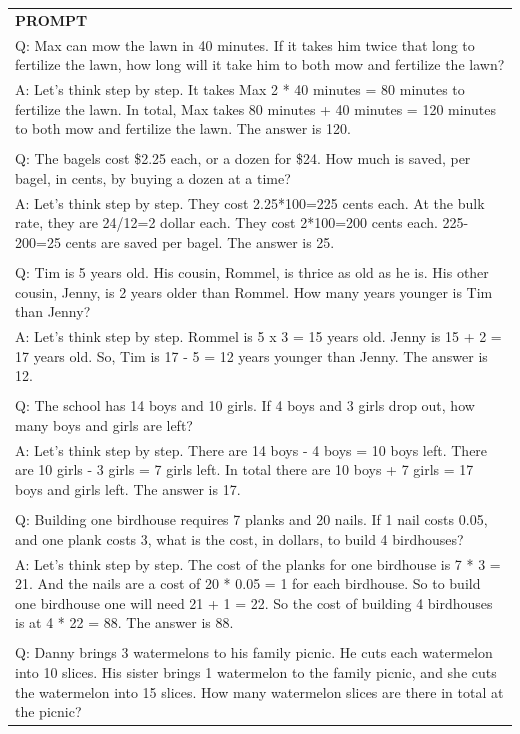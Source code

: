 \begin{table}[h]
    \centering \small
\begin{tabular}{p{13cm}}
\toprule
\textbf{PROMPT}\\
Q: Max can mow the lawn in 40 minutes. If it takes him twice that long to fertilize the lawn, how long will it take him to both mow and fertilize the lawn?
\\A: Let's think step by step. It takes Max 2 * 40 minutes = 80 minutes to fertilize the lawn. In total, Max takes 80 minutes + 40 minutes = 120 minutes to both mow and fertilize the lawn. The answer is 120.
\\
\\Q: The bagels cost \$2.25 each, or a dozen for \$24. How much is saved, per bagel, in cents, by buying a dozen at a time?
\\A: Let's think step by step. They cost 2.25*100=225 cents each. At the bulk rate, they are 24/12=2 dollar each. They cost 2*100=200 cents each. 225-200=25 cents are saved per bagel. The answer is 25.
\\
\\Q: Tim is 5 years old. His cousin, Rommel, is thrice as old as he is. His other cousin, Jenny, is 2 years older than Rommel. How many years younger is Tim than Jenny?
\\A: Let's think step by step. Rommel is 5 x 3 = 15 years old. Jenny is 15 + 2 = 17 years old. So, Tim is 17 - 5 = 12 years younger than Jenny. The answer is 12.
\\
\\Q: The school has 14 boys and 10 girls. If 4 boys and 3 girls drop out, how many boys and girls are left?
\\A: Let's think step by step. There are 14 boys - 4 boys = 10 boys left. There are 10 girls - 3 girls = 7 girls left. In total there are 10 boys + 7 girls = 17 boys and girls left. The answer is 17.
\\
\\Q: Building one birdhouse requires 7 planks and 20 nails. If 1 nail costs 0.05, and one plank costs 3, what is the cost, in dollars, to build 4 birdhouses?
\\A: Let's think step by step. The cost of the planks for one birdhouse is 7 * 3 = 21. And the nails are a cost of 20 * 0.05 = 1 for each birdhouse. So to build one birdhouse one will need 21 + 1 = 22. So the cost of building 4 birdhouses is at 4 * 22 = 88. The answer is 88.
\\
\\Q: Danny brings 3 watermelons to his family picnic. He cuts each watermelon into 10 slices. His sister brings 1 watermelon to the family picnic, and she cuts the watermelon into 15 slices. How many watermelon slices are there in total at the picnic?

\end{tabular}
\end{table}
